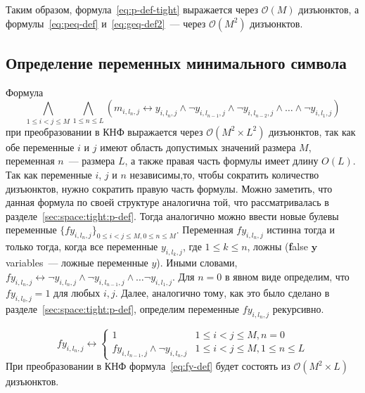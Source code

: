 Таким образом, формула~\eqref{eq:p-def-tight} выражается через $\mathcal{O}\left(M\right)$ дизъюнктов, а формулы~\eqref{eq:peq-def} и~\eqref{eq:geq-def2}~{---} через $\mathcal{O}\left(M^{2}\right)$ дизъюнктов.


\subsection{Определение переменных минимального символа}
\label{sec:space:tight:m-def}

Формула $$\bigwedge_{1 \leq i < j \leq M} \bigwedge_{1 \leq n \leq L} \left(m_{i,l_{n},j} \leftrightarrow y_{i,l_{n},j} \wedge \neg y_{i,l_{n - 1}, j} \wedge \neg y_{i,l_{n - 2}, j} \wedge \ldots \wedge \neg y_{i,l_{1},j} \right)$$ при преобразовании в КНФ выражается через $\mathcal{O}\left(M^{2} \times L^{2}\right)$ дизъюнктов, так как обе переменные $i$ и $j$ имеют область допустимых значений размера $M$, переменная $n$~{---} размера $L$, а также правая часть формулы имеет длину $O\left(L\right)$.
Так как переменные $i$, $j$ и $n$ независимы,то, чтобы сократить количество дизъюнктов, нужно сократить правую часть формулы.
Можно заметить, что данная формула по своей структуре аналогична той, что рассматривалась в разделе~\ref{sec:space:tight:p-def}.
Тогда аналогично можно ввести новые булевы переменные $\{\mathit{fy}_{i,l_{n},j}\}_{0 \leq i < j \leq M,0 \leq n \leq M}$.
Переменная $\mathit{fy}_{i,l_{n},j}$ истинна тогда и только тогда, когда все переменные $y_{i,l_{k},j}$, где $1 \leq k \leq n$, ложны (\textbf{f}alse $\boldsymbol{y}$ variables~{---} ложные переменные $y$).
Иными словами, $\mathit{fy}_{i,l_{n},j} \leftrightarrow \neg y_{i,l_{n},j} \wedge \neg y_{i, l_{n - 1}, j} \wedge \ldots \neg y_{i,l_{1},j}$. 
Для $n = 0$ в явном виде определим, что $\mathit{fy}_{i,l_{0},j} = 1$ для любых $i,j$.
Далее, аналогично тому, как это было сделано в разделе~\ref{sec:space:tight:p-def}, определим переменные $\mathit{fy}_{i,l_{n},j}$ рекурсивно.

\begin{equation}
\label{eq:fy-def}
  \mathit{fy}_{i,l_{n},j} \leftrightarrow 
    \begin{cases} 
      1                               & 1 \leq i < j \leq M, n = 0 \\
      \mathit{fy}_{i,l_{n - 1},j} \wedge \neg y_{i,l_{n},j}  & 1 \leq i < j \leq M, 1 \leq n \leq L
    \end{cases} 
\end{equation}
%
При преобразовании в КНФ формула~\eqref{eq:fy-def} будет состоять из $\mathcal{O}\left(M^{2} \times L\right)$ дизъюнктов.

